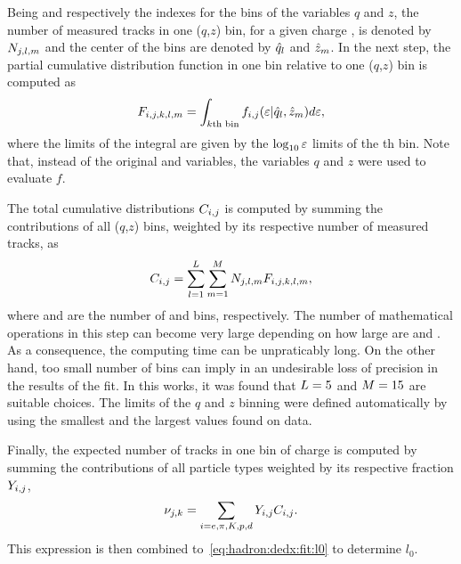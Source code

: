 Being \iq and \iz respectively the indexes for the
bins of the variables $q$ and $z$, the
number of measured tracks in one ($q$,$z$) bin,
for a given charge \ich, is denoted
by $N_{j,l,m}$ and the center of the bins are denoted
by $\hat{q}_{l}$ and $\hat{z}_{m}$. In the next step, the partial
cumulative distribution function in one \ieps bin relative to
one ($q$,$z$) bin is computed as
\begin{equation}
  F_{i,j,k,l,m} = \int_{k\text{th bin}} f_{i,j}(\mbox{$\varepsilon$}|\hat{q}_{l},\hat{z}_{m}) d\mbox{$\varepsilon$},
\end{equation}
where the limits of the integral are given by the $\log_{10}\mbox{$\varepsilon$}$
limits of the {\ieps}th bin. Note that,
instead of the original \pp and \ncl variables,
the variables $q$ and $z$ were used to evaluate $f$.

The total cumulative distributions $C_{i,j}$ is computed by summing
the contributions of all ($q$,$z$) bins, weighted by its respective
number of measured tracks, as
\begin{equation}
  C_{i,j} = \sum_{l=1}^{L} \sum_{m=1}^{M} N_{j,l,m} F_{i,j,k,l,m},
\end{equation}
where \nq and \nz are the number of \iq and \iz bins, respectively.
The number of mathematical operations in this step
can become very large depending on how large are \nq and \nz.
As a consequence, the computing time can be unpraticably long.
On the other hand,
too small number of bins can imply in an undesirable loss of precision
in the results of the fit. In this works,
it was found that $L = 5$ and $M = 15$ are suitable choices.
The limits of the $q$ and $z$ binning were defined automatically
by using the smallest and the largest values found on data.

Finally, the expected number of tracks in one \ieps bin of charge \ich
is computed by summing the contributions of all particle types
weighted by its respective fraction $Y_{i,j}$,
\begin{equation}
  \nu_{j,k} = \sum_{i=e,\pi,K,p,d} Y_{i,j} C_{i,j}.
  \label{eq:hadron:dedx:fit:exp}
\end{equation}
This expression is then combined to~\cref{eq:hadron:dedx:fit:l0}
to determine $l_0$.

